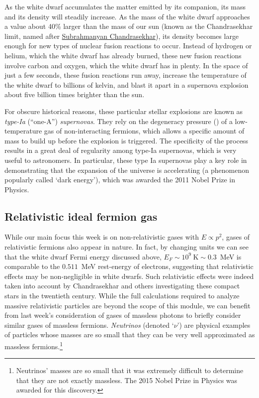As the white dwarf accumulates the matter emitted by its companion, its mass and its density will steadily increase.
As the mass of the white dwarf approaches a value about 40\% larger than the mass of our sun (known as the Chandrasekhar limit, named after \href{https://en.wikipedia.org/wiki/Subrahmanyan_Chandrasekhar}{Subrahmanyan Chandrasekhar}), its density becomes large enough for new types of nuclear fusion reactions to occur.
Instead of hydrogen or helium, which the white dwarf has already burned, these new fusion reactions involve carbon and oxygen, which the white dwarf has in plenty.
In the space of just a few seconds, these fusion reactions run away, increase the temperature of the white dwarf to billions of kelvin, and blast it apart in a supernova explosion about five billion times brighter than the sun.

For obscure historical reasons, these particular stellar explosions are known as \textit{type-Ia} (``one-A'') \textit{supernovas}.
They rely on the degeneracy pressure () of a low-temperature gas of non-interacting fermions, which allows a specific amount of mass to build up before the explosion is triggered.
The specificity of the process results in a great deal of regularity among type-Ia supernovas, which is very useful to astronomers.
In particular, these type Ia supernovas play a key role in demonstrating that the expansion of the universe is accelerating (a phenomenon popularly called `dark energy'), which was awarded the 2011 Nobel Prize in Physics.



\subsection{Relativistic ideal fermion gas}
While our main focus this week is on non-relativistic gases with $E \propto p^2$, gases of relativistic fermions also appear in nature.
In fact, by changing units we can see that the white dwarf Fermi energy discussed above, $E_F \sim 10^9~\text{K} \sim 0.3$~MeV is comparable to the $0.511$~MeV rest-energy of electrons, suggesting that relativistic effects may be non-negligible in white dwarfs.
Such relativistic effects were indeed taken into account by Chandrasekhar and others investigating these compact stars in the twentieth century.
While the full calculations required to analyze massive relativistic particles are beyond the scope of this module, we can benefit from last week's consideration of gases of massless photons to briefly consider similar gases of massless fermions.
\textit{Neutrinos} (denoted `$\nu$') are physical examples of particles whose masses are so small that they can be very well approximated as massless fermions.\footnote{Neutrinos' masses are so small that it was extremely difficult to determine that they are not exactly massless.  The 2015 Nobel Prize in Physics was awarded for this discovery.}

